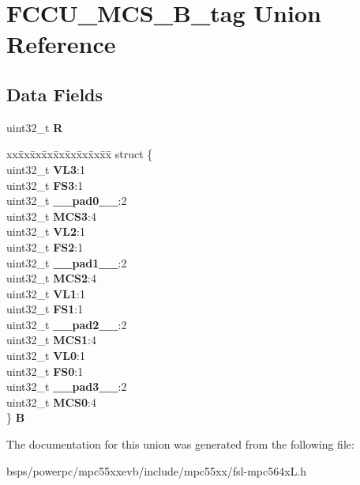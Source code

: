 \hypertarget{unionFCCU__MCS__32B__tag}{}\section{F\+C\+C\+U\+\_\+\+M\+C\+S\+\_\+B\+\_\+tag Union Reference}
\label{unionFCCU__MCS__32B__tag}
\subsection*{Data Fields}
\begin{DoxyCompactItemize}
\item 
\mbox{\label{unionFCCU__MCS__32B__tag_aa91c9e9bc64b60f5e48b3e31a2b6535a}} 
uint32\+\_\+t {\bfseries R}
\item 
\mbox{\label{unionFCCU__MCS__32B__tag_ad055d39a3de92c0f5f0f8ee5d2a9e5cc}} 
\begin{tabbing}
xx\=xx\=xx\=xx\=xx\=xx\=xx\=xx\=xx\=\kill
struct \{\\
\>uint32\_t {\bfseries VL3}:1\\
\>uint32\_t {\bfseries FS3}:1\\
\>uint32\_t {\bfseries \_\_pad0\_\_}:2\\
\>uint32\_t {\bfseries MCS3}:4\\
\>uint32\_t {\bfseries VL2}:1\\
\>uint32\_t {\bfseries FS2}:1\\
\>uint32\_t {\bfseries \_\_pad1\_\_}:2\\
\>uint32\_t {\bfseries MCS2}:4\\
\>uint32\_t {\bfseries VL1}:1\\
\>uint32\_t {\bfseries FS1}:1\\
\>uint32\_t {\bfseries \_\_pad2\_\_}:2\\
\>uint32\_t {\bfseries MCS1}:4\\
\>uint32\_t {\bfseries VL0}:1\\
\>uint32\_t {\bfseries FS0}:1\\
\>uint32\_t {\bfseries \_\_pad3\_\_}:2\\
\>uint32\_t {\bfseries MCS0}:4\\
\} {\bfseries B}\\

\end{tabbing}\end{DoxyCompactItemize}


The documentation for this union was generated from the following file\+:\begin{DoxyCompactItemize}
\item 
bsps/powerpc/mpc55xxevb/include/mpc55xx/fsl-\/mpc564x\+L.\+h\end{DoxyCompactItemize}
